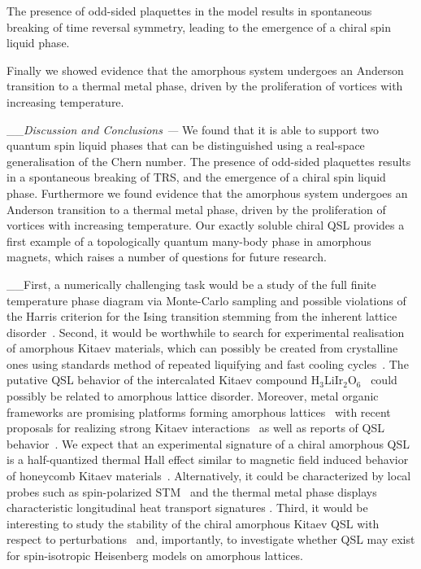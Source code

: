 The presence of odd-sided plaquettes in the model results in spontaneous breaking of time reversal symmetry, leading to the emergence of a chiral spin liquid phase.

Finally we showed evidence that the amorphous system undergoes an Anderson transition to a thermal metal phase, driven by the proliferation of vortices with increasing temperature.

\_\_\emph{Discussion and Conclusions ---} We found that it is able to support two quantum spin liquid phases that can be distinguished using a real-space generalisation of the Chern number. The presence of odd-sided plaquettes results in a spontaneous breaking of TRS, and the emergence of a chiral spin liquid phase. Furthermore we found evidence that the amorphous system undergoes an Anderson transition to a thermal metal phase, driven by the proliferation of vortices with increasing temperature. Our exactly soluble chiral QSL provides a first example of a topologically quantum many-body phase in amorphous magnets, which raises a number of questions for future research.

\_\_First, a numerically challenging task would be a study of the full finite temperature phase diagram via Monte-Carlo sampling and possible violations of the Harris criterion for the Ising transition stemming from the inherent lattice disorder~\autocite{barghathi2014phase,schrauth2018two,schrauth2018violation}. Second, it would be worthwhile to search for experimental realisation of amorphous Kitaev materials, which can possibly be created from crystalline ones using standards method of repeated liquifying and fast cooling cycles~\autocite{Weaire1976,Petrakovski1981,Kaneyoshi2018}. The putative QSL behavior of the intercalated Kitaev compound H\(_3\)LiIr\(_2\)O\(_6\)~\autocite{kitagawa2018spin,knolle2019bond} could possibly be related to amorphous lattice disorder. Moreover, metal organic frameworks are promising platforms forming amorphous lattices~\autocite{bennett2014amorphous} with recent proposals for realizing strong Kitaev interactions~\autocite{yamada2017designing} as well as reports of QSL behavior~\autocite{misumi2020quantum}. We expect that an experimental signature of a chiral amorphous QSL is a half-quantized thermal Hall effect similar to magnetic field induced behavior of honeycomb Kitaev materials~\autocite{Kasahara2018,Yokoi2021,Yamashita2020,Bruin2022}. Alternatively, it could be characterized by local probes such as spin-polarized STM~\autocite{Feldmeier2020,Konig2020,Udagawa2021} and the thermal metal phase displays characteristic longitudinal heat transport signatures \autocite{Beenakker2013}. Third, it would be interesting to study the stability of the chiral amorphous Kitaev QSL with respect to perturbations~\autocite{Rau2014,Chaloupka2010,Chaloupka2013,Chaloupka2015,Winter2016} and, importantly, to investigate whether QSL may exist for spin-isotropic Heisenberg models on amorphous lattices.


